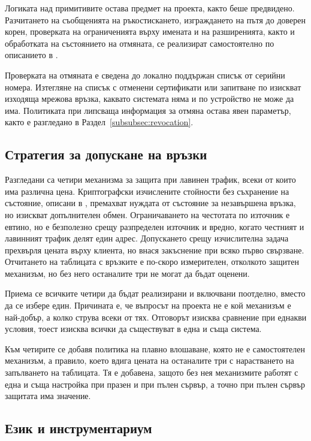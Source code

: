 Логиката над примитивите остава предмет на проекта, както беше предвидено. Разчитането на
съобщенията на ръкостискането, изграждането на пътя до доверен корен, проверката на
ограниченията върху имената и на разширенията, както и обработката на състоянието на
отмяната, се реализират самостоятелно по описанието в \cite{rfc5280}.

Проверката на отмяната е сведена до локално поддържан списък от серийни номера. Изтегляне
на списък с отменени сертификати или запитване по \cite{rfc6960} изискват изходяща мрежова
връзка, каквато системата няма и по устройство не може да има. Политиката при липсваща
информация за отмяна остава явен параметър, както е разгледано в
Раздел~\ref{subsubsec:revocation}.

\subsection{Стратегия за допускане на връзки}
\label{subsec:admission}

Разгледани са четири механизма за защита при лавинен трафик, всеки от които има различна
цена. Криптографски изчислените стойности без съхранение на състояние, описани в
\cite{rfc4987}, премахват нуждата от състояние за незавършена връзка, но изискват
допълнителен обмен. Ограничаването на честотата по източник е евтино, но е безполезно срещу
разпределен източник и вредно, когато честният и лавинният трафик делят един адрес.
Допускането срещу изчислителна задача прехвърля цената върху клиента, но внася закъснение
при всяко първо свързване. Отчитането на таблицата с връзките е по-скоро измерителен,
отколкото защитен механизъм, но без него останалите три не могат да бъдат оценени.

Приема се всичките четири да бъдат реализирани и включвани поотделно, вместо да се избере
един. Причината е, че въпросът на проекта не е кой механизъм е най-добър, а колко струва
всеки от тях. Отговорът изисква сравнение при еднакви условия, тоест изисква всички да
съществуват в една и съща система.

Към четирите се добавя политика на плавно влошаване, която не е самостоятелен механизъм, а
правило, което вдига цената на останалите три с нарастването на запълването на таблицата.
Тя е добавена, защото без нея механизмите работят с една и съща настройка при празен и при
пълен сървър, а точно при пълен сървър защитата има значение.

\subsection{Език и инструментариум}
\label{subsec:language}

